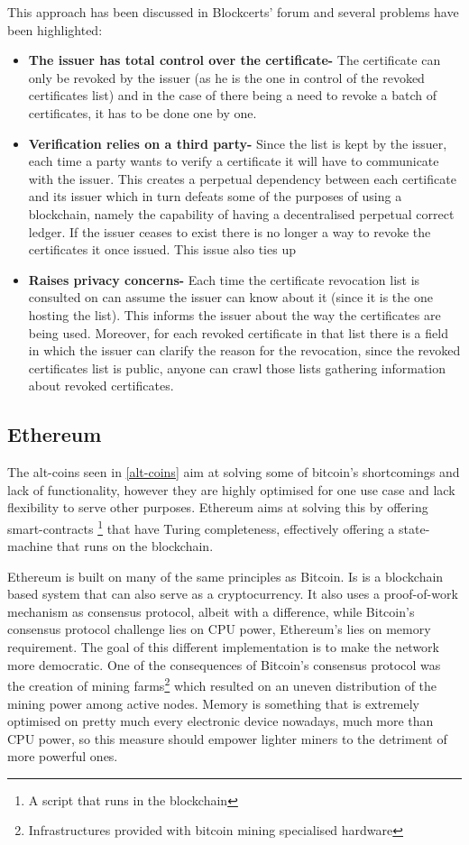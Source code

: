 \documentclass[llncsdoc]{llncs}
\begin{document}
This approach has been discussed in Blockcerts' forum and several problems have been highlighted:
\begin{itemize}
    \item \textbf{The issuer has total control over the certificate-} The certificate can only be revoked by the issuer (as he is the one in control of the revoked certificates list) and in the case of there being a need to revoke a batch of certificates, it has to be done one by one.
    \item \textbf{Verification relies on a third party-} Since the list is kept by the issuer, each time a party wants to verify a certificate it will have to communicate with the issuer. This creates a perpetual dependency between each certificate and its issuer which in turn defeats some of the purposes of using a blockchain, namely the capability of having a decentralised perpetual correct ledger. If the issuer ceases to exist there is no longer a way to revoke the certificates it once issued. This issue also ties up
    \item \textbf{Raises privacy concerns-} Each time the certificate revocation list is consulted on can assume the issuer can know about it (since it is the one hosting the list). This informs the issuer about the way the certificates are being used. Moreover, for each revoked certificate in that list there is a field in which the issuer can clarify the reason for the revocation, since the revoked certificates list is public, anyone can crawl those lists gathering information about revoked certificates.
  
\end{itemize}




\subsection{Ethereum}
The alt-coins seen in \ref{alt-coins} aim at solving some of bitcoin's shortcomings and lack of functionality, however they are highly optimised for one use case and lack flexibility to serve other purposes. Ethereum aims at solving this by offering smart-contracts \footnote{A script that runs in the blockchain} that have Turing completeness, effectively offering a state-machine that runs on the blockchain.

Ethereum is built on many of the same principles as Bitcoin. Is is a blockchain based system that can also serve as a cryptocurrency. It also uses a proof-of-work mechanism as consensus protocol, albeit with a difference, while Bitcoin's consensus protocol challenge lies on CPU power, Ethereum's lies on memory requirement. The goal of this different implementation is to make the network more democratic. One of the consequences of Bitcoin's consensus protocol was the creation of mining farms\footnote{Infrastructures provided with bitcoin mining specialised hardware} which resulted on an uneven distribution of the mining power among active nodes. Memory is something that is extremely optimised on pretty much every electronic device nowadays, much more than CPU power, so this measure should empower lighter miners to the detriment of more powerful ones.
\end{document}

